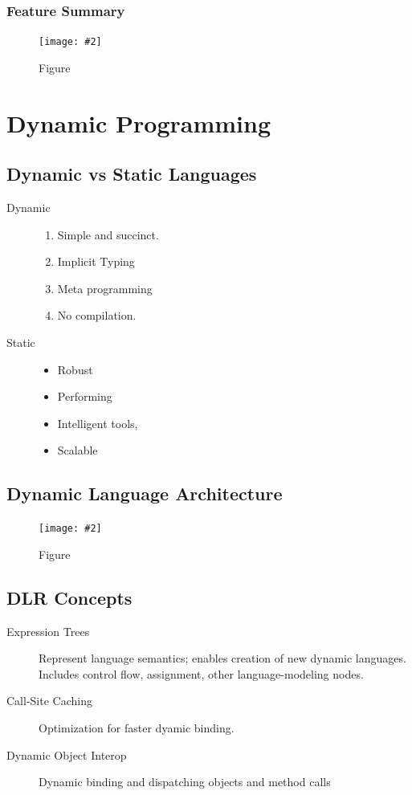 \documentclass[a4paper,10pt]{scrartcl}
\newcommand{\pic}[2][Figure]{
  \begin{figure}[h!]
   \centering
   \texttt{[image: \#2]}
   \caption{{#1}}
  \end{figure}
}
\begin{document}
\subsubsection{Feature Summary}
\pic{lambda3.png}

\section{Dynamic Programming}

\subsection{Dynamic vs Static Languages}
\begin{description}
 \item [Dynamic] \begin{enumerate}
                  \item Simple and succinct.
                  \item Implicit Typing
                  \item Meta programming
                  \item No compilation.
                  
                 \end{enumerate}
\item[Static] \begin{itemize}
               \item Robust
               \item Performing
               \item Intelligent tools,
               \item Scalable
              \end{itemize}


\end{description}

\subsection{Dynamic Language Architecture}
\pic{lambda4.png}

\subsection{DLR Concepts}
\begin{description}
 \item [Expression Trees] Represent language semantics; enables creation of
new dynamic languages. Includes control flow,
assignment, other language-modeling nodes.
\item[Call-Site Caching] Optimization for faster dyamic binding.
\item [Dynamic Object Interop]  Dynamic binding and dispatching objects and method
calls
\end{description}
\end{document}
